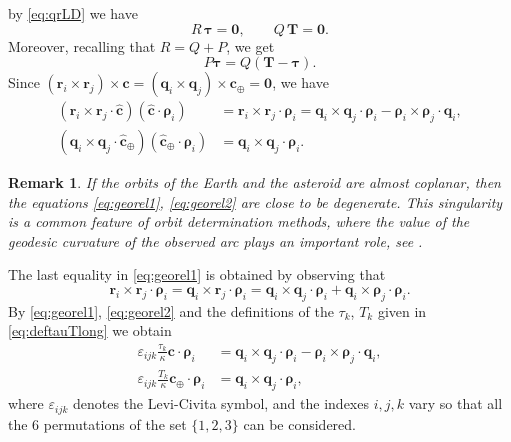 \documentclass[11pt]{article}
\def\angmom{\bm{c}}
\def\angmom{{\bm{c}}}
\newtheorem{remark}{\bf Remark}
\begin{document}
by \eqref{eq:qrLD} we have 
\begin{equation*}
    R\,\bm{\tau} = \bm{0},
    \qquad
    Q\,\bm{T} = \bm{0}.
\end{equation*}
Moreover, recalling that $R = Q + P$, we get
\begin{equation}\label{eq:91_new}
    P\bm{\tau} = Q(\bm{T}-\bm{\tau}).
\end{equation}
Since $(\bm{r}_i\times\bm{r}_j)\times\angmom = (\bm{q}_i\times\bm{q}_j)\times\angmom_\oplus = {\bm 0}$, we have
\begin{align}
    \left(\bm{r}_i\times\bm{r}_j\cdot\hat{\bm{c}}\right)\left(\hat{\bm{c}}\cdot\bm{\rho}_i\right)
    &= \bm{r}_i\times\bm{r}_j\cdot\bm{\rho}_i
    = \bm{q}_i\times\bm{q}_j \cdot\bm{\rho}_i - \bm{\rho}_i\times\bm{\rho}_j \cdot\bm{q}_i,
    \label{eq:georel1}\\
    (\bm{q}_i\times\bm{q}_j\cdot\hat{\angmom}_\oplus)(\hat{\angmom}_\oplus\cdot\bm{\rho}_i)
    &= \bm{q}_i\times\bm{q}_j\cdot\bm{\rho}_i.\label{eq:georel2}
\end{align}
\begin{remark}
    If the orbits of the Earth and the asteroid are almost coplanar, then the equations \eqref{eq:georel1}, \eqref{eq:georel2} are close to be degenerate. 
    This singularity is a common feature of orbit determination methods, where the value of the geodesic curvature of the observed arc plays an important role, see \cite[Chap. 9]{mg2010}.
\end{remark}
The last equality in \eqref{eq:georel1} is obtained by observing that
\begin{equation*}
    \bm{r}_i\times\bm{r}_j \cdot\bm{\rho}_i = \bm{q}_i\times\bm{r}_j
    \cdot\bm{\rho}_i = \bm{q}_i\times\bm{q}_j \cdot\bm{\rho}_i +
    \bm{q}_i\times\bm{\rho}_j \cdot\bm{\rho}_i.
\end{equation*}
By \eqref{eq:georel1}, \eqref{eq:georel2} and the definitions of the $\tau_k$, $T_k$ given in \eqref{eq:deftauTlong} we obtain
\begin{align}
    \varepsilon_{ijk}\frac{\tau_k}{\kappa}\bm{c}\cdot\bm{\rho}_i &= \bm{q}_i\times\bm{q}_j \cdot\bm{\rho}_i -
    \bm{\rho}_i\times\bm{\rho}_j \cdot\bm{q}_i,\label{eq:reltau}\\[1ex]
    \varepsilon_{ijk}\frac{T_k}{\kappa}\bm{c}_\oplus\cdot\bm{\rho}_i &= \bm{q}_i\times\bm{q}_j \cdot\bm{\rho}_i,
    \label{eq:relbigT}
\end{align}
where $\varepsilon_{ijk}$ denotes the Levi-Civita symbol, and the indexes $i,j,k$ vary so that all the 6 permutations of the set $\{1,2,3\}$ can be considered.
\end{document}
